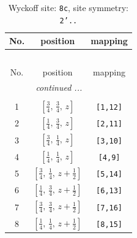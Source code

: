 \documentclass[fleqn,8pt]{jsarticle}
\begin{document}
\renewcommand{\arraystretch}{1.2}
\begin{longtable}{ccc}
\caption{Wyckoff site: {\tt 8c}, site symmetry: {\tt 2'..}}
 \\
 \hline \hline
No. & position & mapping \\ \hline \endfirsthead

\multicolumn{2}{l}{\tablename\ \thetable{}} \\
 \hline \hline
No. & position & mapping \\ \hline \endhead

 \hline \hline
\multicolumn{2}{r}{\footnotesize\it continued ...} \\ \endfoot

 \hline \hline
\multicolumn{2}{r}{} \\ \endlastfoot

1 & $\left[ \frac{3}{4},\, \frac{3}{4},\, z \right]$ & {\tt [1,12]} \\ \hline
2 & $\left[ \frac{1}{4},\, \frac{3}{4},\, z \right]$ & {\tt [2,11]} \\ \hline
3 & $\left[ \frac{3}{4},\, \frac{1}{4},\, z \right]$ & {\tt [3,10]} \\ \hline
4 & $\left[ \frac{1}{4},\, \frac{1}{4},\, z \right]$ & {\tt [4,9]} \\ \hline
5 & $\left[ \frac{3}{4},\, \frac{1}{4},\, z + \frac{1}{2} \right]$ & {\tt [5,14]} \\ \hline
6 & $\left[ \frac{1}{4},\, \frac{3}{4},\, z + \frac{1}{2} \right]$ & {\tt [6,13]} \\ \hline
7 & $\left[ \frac{3}{4},\, \frac{3}{4},\, z + \frac{1}{2} \right]$ & {\tt [7,16]} \\ \hline
8 & $\left[ \frac{1}{4},\, \frac{1}{4},\, z + \frac{1}{2} \right]$ & {\tt [8,15]} \\
\end{longtable}
\renewcommand{\arraystretch}{1.2}
\end{document}
